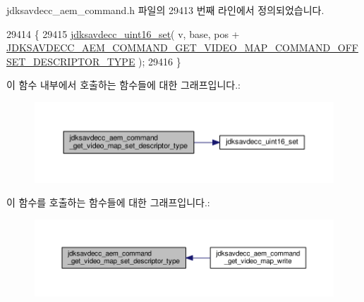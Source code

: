 jdksavdecc\+\_\+aem\+\_\+command.\+h 파일의 29413 번째 라인에서 정의되었습니다.


\begin{DoxyCode}
29414 \{
29415     \hyperlink{group__endian_ga14b9eeadc05f94334096c127c955a60b}{jdksavdecc\_uint16\_set}( v, base, pos + 
      \hyperlink{group__command__get__video__map_ga6b1d15ea19ab8d2391ce33af996d6b47}{JDKSAVDECC\_AEM\_COMMAND\_GET\_VIDEO\_MAP\_COMMAND\_OFFSET\_DESCRIPTOR\_TYPE}
       );
29416 \}
\end{DoxyCode}


이 함수 내부에서 호출하는 함수들에 대한 그래프입니다.\+:
\nopagebreak
\begin{figure}[H]
\begin{center}
\leavevmode
\includegraphics[width=350pt]{group__command__get__video__map_ga6048afab9d86174f17ef15159949937a_cgraph}
\end{center}
\end{figure}




이 함수를 호출하는 함수들에 대한 그래프입니다.\+:
\nopagebreak
\begin{figure}[H]
\begin{center}
\leavevmode
\includegraphics[width=350pt]{group__command__get__video__map_ga6048afab9d86174f17ef15159949937a_icgraph}
\end{center}
\end{figure}


